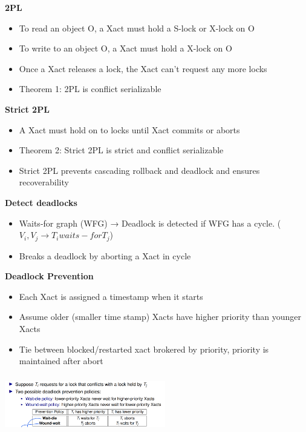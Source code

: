\documentclass[10pt, landscape]{article}
\begin{document}
\begin{multicols}{4}
\textbf{2PL} \\
\begin{itemize} 
  \item To read an object O, a Xact must hold a S-lock or X-lock on O 
  \item To write to an object O, a Xact must hold a X-lock on O 
  \item Once a Xact releases a lock, the Xact can't request any more locks
  \item Theorem 1: 2PL is conflict serializable
\end{itemize}

\textbf{Strict 2PL} \\
\begin{itemize}
  \item A Xact must hold on to locks until Xact commits or aborts
  \item Theorem 2: Strict 2PL is strict and conflict serializable
  \item Strict 2PL prevents cascading rollback and deadlock and ensures recoverability
\end{itemize}

\textbf{Detect deadlocks} \\
\begin{itemize}
  \item Waits-for graph (WFG) → Deadlock is detected if WFG has a cycle. ($V_i, V_j \rightarrow T_i waits-for T_j$)
  \item Breaks a deadlock by aborting a Xact in cycle
\end{itemize}

\textbf{Deadlock Prevention} \\
\begin{itemize}
  \item Each Xact is assigned a timestamp when it starts
  \item Assume older (smaller time stamp) Xacts have higher priority than younger Xacts
  \item Tie between blocked/restarted xact brokered by priority, priority is maintained after abort
\end{itemize}

\includegraphics[width=7cm, height =2.5cm]{deadlock_prevention.png}



\end{multicols}
\end{document}
